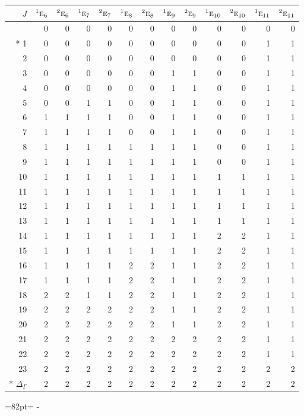 \documentclass[10pt,a4paper]{article}
\makeatletter
\def\grouprule#1#2{\noalign{\marks\LTgroupmarks{\the\belowrulesep}\nobreak\vskip#1%
  \vskip\aboverulesep}\multispan\LT@cols\unskip{\leaders\hrule\@height#2\hfill\kern\z@}\cr
  \noalign{\penalty\LTrulebreak\vskip\belowrulesep\global\@lastruleclass\z@}}
\newcommand{\needspace}[1]{\par\penalty-100\begingroup\dimen0=#1\relax\dimen2=\pagegoal
  \advance\dimen2-\pagetotal\ifdim\dimen0>\dimen2\relax\ifdim\dimen2>0pt\vfil\break\fi\fi
  \endgroup}
\numberwithin{equation}{section}
\newcommand{\irr}[1]{\text{\normalfont\scshape #1}}
\newcommand{\conjpair}[1]{{}^{#1}}
\makeatother
\begin{document}
{\small\begin{longtable}{@{}rrrrrrrrrrrrr@{}}\toprule
$J$ & $\conjpair{1}\irr{e}_{6}$ & $\conjpair{2}\irr{e}_{6}$ & $\conjpair{1}\irr{e}_{7}$ & $\conjpair{2}\irr{e}_{7}$ & $\conjpair{1}\irr{e}_{8}$ & $\conjpair{2}\irr{e}_{8}$ & $\conjpair{1}\irr{e}_{9}$ & $\conjpair{2}\irr{e}_{9}$ & $\conjpair{1}\irr{e}_{10}$ & $\conjpair{2}\irr{e}_{10}$ & $\conjpair{1}\irr{e}_{11}$ & $\conjpair{2}\irr{e}_{11}$\\\midrule\endhead
\bottomrule\endfoot\endlastfoot
0 & 0 & 0 & 0 & 0 & 0 & 0 & 0 & 0 & 0 & 0 & 0 & 0\\*
1 & 0 & 0 & 0 & 0 & 0 & 0 & 0 & 0 & 0 & 0 & 1 & 1\\
2 & 0 & 0 & 0 & 0 & 0 & 0 & 0 & 0 & 0 & 0 & 1 & 1\\
3 & 0 & 0 & 0 & 0 & 0 & 0 & 1 & 1 & 0 & 0 & 1 & 1\\
4 & 0 & 0 & 0 & 0 & 0 & 0 & 1 & 1 & 0 & 0 & 1 & 1\\
5 & 0 & 0 & 1 & 1 & 0 & 0 & 1 & 1 & 0 & 0 & 1 & 1\\
6 & 1 & 1 & 1 & 1 & 0 & 0 & 1 & 1 & 0 & 0 & 1 & 1\\
7 & 1 & 1 & 1 & 1 & 0 & 0 & 1 & 1 & 0 & 0 & 1 & 1\\
8 & 1 & 1 & 1 & 1 & 1 & 1 & 1 & 1 & 0 & 0 & 1 & 1\\
9 & 1 & 1 & 1 & 1 & 1 & 1 & 1 & 1 & 0 & 0 & 1 & 1\\
10 & 1 & 1 & 1 & 1 & 1 & 1 & 1 & 1 & 1 & 1 & 1 & 1\\
11 & 1 & 1 & 1 & 1 & 1 & 1 & 1 & 1 & 1 & 1 & 1 & 1\\
12 & 1 & 1 & 1 & 1 & 1 & 1 & 1 & 1 & 1 & 1 & 1 & 1\\
13 & 1 & 1 & 1 & 1 & 1 & 1 & 1 & 1 & 1 & 1 & 1 & 1\\
14 & 1 & 1 & 1 & 1 & 1 & 1 & 1 & 1 & 2 & 2 & 1 & 1\\
15 & 1 & 1 & 1 & 1 & 1 & 1 & 1 & 1 & 2 & 2 & 1 & 1\\
16 & 1 & 1 & 1 & 1 & 2 & 2 & 1 & 1 & 2 & 2 & 1 & 1\\
17 & 1 & 1 & 1 & 1 & 2 & 2 & 1 & 1 & 2 & 2 & 1 & 1\\
18 & 2 & 2 & 1 & 1 & 2 & 2 & 1 & 1 & 2 & 2 & 1 & 1\\
19 & 2 & 2 & 2 & 2 & 2 & 2 & 1 & 1 & 2 & 2 & 1 & 1\\
20 & 2 & 2 & 2 & 2 & 2 & 2 & 1 & 1 & 2 & 2 & 1 & 1\\
21 & 2 & 2 & 2 & 2 & 2 & 2 & 2 & 2 & 2 & 2 & 1 & 1\\
22 & 2 & 2 & 2 & 2 & 2 & 2 & 2 & 2 & 2 & 2 & 1 & 1\\
23 & 2 & 2 & 2 & 2 & 2 & 2 & 2 & 2 & 2 & 2 & 2 & 2\\*
\grouprule{0pt}{\lightrulewidth} $\Delta_\Gamma$ & 2 & 2 & 2 & 2 & 2 & 2 & 2 & 2 & 2 & 2 & 2 & 2\\
\bottomrule\end{longtable}}
\needspace{82pt}
\end{document}
